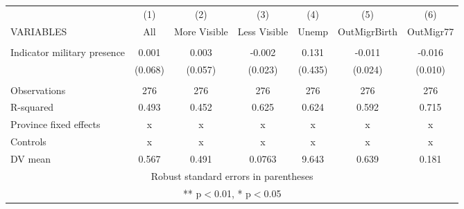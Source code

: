 \begin{tabular}{lcccccc} \hline
 & (1) & (2) & (3) & (4) & (5) & (6) \\
VARIABLES & All & More Visible & Less Visible & Unemp & OutMigrBirth & OutMigr77 \\ \hline
 &  &  &  &  &  &  \\
Indicator military presence & 0.001 & 0.003 & -0.002 & 0.131 & -0.011 & -0.016 \\
 & (0.068) & (0.057) & (0.023) & (0.435) & (0.024) & (0.010) \\
 &  &  &  &  &  &  \\
Observations & 276 & 276 & 276 & 276 & 276 & 276 \\
R-squared & 0.493 & 0.452 & 0.625 & 0.624 & 0.592 & 0.715 \\
Province fixed effects & x & x & x & x & x & x \\
Controls & x & x & x & x & x & x \\
 DV mean & 0.567 & 0.491 & 0.0763 & 9.643 & 0.639 & 0.181 \\ \hline
\multicolumn{7}{c}{ Robust standard errors in parentheses} \\
\multicolumn{7}{c}{ ** p$<$0.01, * p$<$0.05} \\
\end{tabular}
